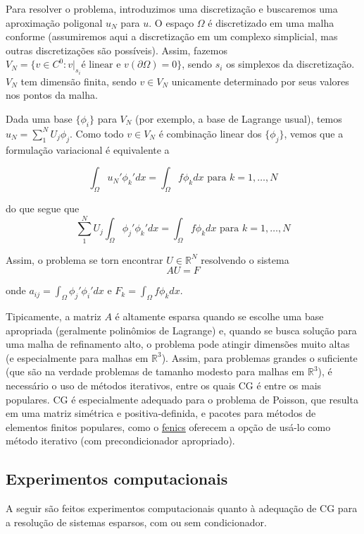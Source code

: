 \documentclass[11pt]{article}
\begin{document}
    Para resolver o problema, introduzimos uma discretização e buscaremos
uma aproximação poligonal \(u_N\) para \(u\). O espaço \(\Omega\) é
discretizado em uma malha conforme (assumiremos aqui a discretização em
um complexo simplicial, mas outras discretizações são possíveis). Assim,
fazemos
\(V_N = \{v \in C^0 : v|_{s_i} \text{é linear e } v(\partial \Omega) = 0 \}\),
sendo \(s_i\) os simplexos da discretização. \(V_N\) tem dimensão
finita, sendo \(v \in V_N\) unicamente determinado por seus valores nos
pontos da malha.

    Dada uma base \(\{\phi_i\}\) para \(V_N\) (por exemplo, a base de
Lagrange usual), temos \(u_N = \sum_1^N U_j\phi_j\). Como todo
\(v \in V_N\) é combinação linear dos \(\{\phi_j\}\), vemos que a
formulação variacional é equivalente a

    \[
\int_{\Omega} u_N' \phi_k' dx = \int_{\Omega} f \phi_k dx \text{ para } k = 1,\ldots, N
\]

do que segue que \[
\sum_1^N U_j\int_{\Omega} \phi_j'\phi_k' dx = \int_{\Omega} f \phi_k dx \text{ para } k = 1,\ldots, N
\]

Assim, o problema se torn encontrar \(U \in \mathbb R^N\) resolvendo o
sistema \[
AU = F
\]

onde \(a_{ij} = \int_{\Omega} \phi_j' \phi_i' dx\) e
\(F_k = \int_{\Omega} f \phi_k dx\).

Tipicamente, a matriz \(A\) é altamente esparsa quando se escolhe uma
base apropriada (geralmente polinômios de Lagrange) e, quando se busca
solução para uma malha de refinamento alto, o problema pode atingir
dimensões muito altas (e especialmente para malhas em \(\mathbb R^3\)).
Assim, para problemas grandes o suficiente (que são na verdade problemas
de tamanho modesto para malhas em \(\mathbb R^3\)), é necessário o uso
de métodos iterativos, entre os quais CG é entre os mais populares. CG é
especialmente adequado para o problema de Poisson, que resulta em uma
matriz simétrica e positiva-definida, e pacotes para métodos de
elementos finitos populares, como o
\href{https://fenicsproject.org/}{fenics} oferecem a opção de usá-lo
como método iterativo (com precondicionador apropriado).

    \subsection{Experimentos
computacionais}\label{experimentos-computacionais}

A seguir são feitos experimentos computacionais quanto à adequação de CG
para a resolução de sistemas esparsos, com ou sem condicionador.
\end{document}

